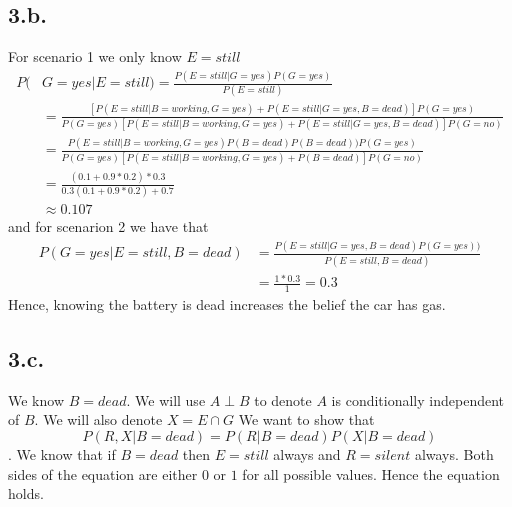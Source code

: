 \documentclass{article}
\begin{document}
\subsection*{3.b.}
For scenario 1 we only know $E=still$
\begin{align*}
    P( & G=yes  | E=still)  = \frac{P(E=still | G=yes)P(G=yes)}{P(E=still)}          \\
       & = \frac{[P(E=still | B=working,G=yes) + P(E=still | G=yes,B=dead)]P(G=yes)}
    {P(G=yes)[P(E=still | B=working,G=yes) + P(E=still | G=yes, B=dead)]P(G=no)}     \\
       & = \frac{P(E=still | B=working,G=yes)P(B=dead)P(B=dead))P(G=yes)}
    {P(G=yes)[P(E=still | B=working,G=yes) + P(B=dead)]P(G=no)}                      \\
       & = \frac{(0.1+0.9*0.2)*0.3}{0.3(0.1+0.9*0.2)+0.7}                            \\
       & \approx 0.107
\end{align*}
and for scenarion 2 we have that
\begin{align*}
    P(G=yes | E=still, B=dead) & = \frac{P(E=still | G=yes, B=dead)P(G=yes))}{P(E=still, B=dead)} \\
                               & = \frac{1*0.3}{1} = 0.3
\end{align*}
Hence, knowing the battery is dead increases the belief the car has gas.

\subsection*{3.c.}
We know $B=dead$. We will use $A\perp B$ to denote $A$ is conditionally
independent of $B$. We will also denote $X=E\cap G$ We want to show that
\[P(R,X | B=dead) = P(R|B=dead)P(X|B=dead)\].
We know that if $B=dead$ then $E=still$ always and $R=silent$ always.
Both sides of the equation are either $0$ or $1$ for all possible
values. Hence the equation holds.
\end{document}
